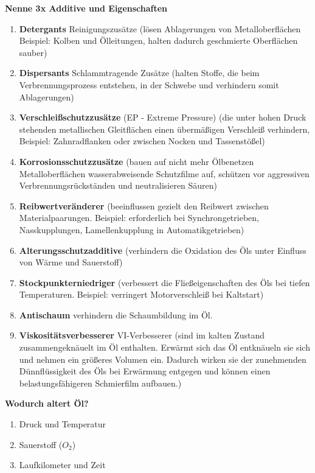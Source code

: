 \textbf{Nenne 3x Additive und Eigenschaften}

\begin{enumerate}
\item
  \textbf{Detergants} Reinigungszusätze (lösen Ablagerungen von
  Metalloberflächen Beispiel: Kolben und Ölleitungen, halten dadurch
  geschmierte Oberflächen sauber)
\item
  \textbf{Dispersants} Schlammtragende Zusätze (halten Stoffe, die beim
  Verbrennungsprozess entstehen, in der Schwebe und verhindern somit
  Ablagerungen)
\item
  \textbf{Verschleißschutzzusätze} (EP - Extreme Pressure) (die unter
  hohen Druck stehenden metallischen Gleitflächen einen übermäßigen
  Verschleiß verhindern, Beispiel: Zahnradflanken oder zwischen Nocken
  und Tassenstößel)
\item
  \textbf{Korrosionsschutzzusätze} (bauen auf nicht mehr Ölbenetzen
  Metalloberflächen wasserabweisende Schutzfilme auf, schützen vor
  aggressiven Verbrennungsrückständen und neutralisieren Säuren)
\item
  \textbf{Reibwertveränderer} (beeinflussen gezielt den Reibwert
  zwischen Materialpaarungen. Beispiel: erforderlich bei
  Synchrongetrieben, Nasskupplungen, Lamellenkupplung in
  Automatikgetrieben)
\item
  \textbf{Alterungsschutzadditive} (verhindern die Oxidation des Öls
  unter Einfluss von Wärme und Sauerstoff)
\item
  \textbf{Stockpunkterniedriger} (verbessert die Fließeigenschaften des
  Öls bei tiefen Temperaturen. Beispiel: verringert Motorverschleiß bei
  Kaltstart)
\item
  \textbf{Antischaum} verhindern die Schaumbildung im Öl.
\item
  \textbf{Viskositätsverbesserer} VI-Verbesserer (sind im kalten Zustand
  zusammengeknäuelt im Öl enthalten. Erwärmt sich das Öl entknäueln sie
  sich und nehmen ein größeres Volumen ein. Dadurch wirken sie der
  zunehmenden Dünnflüssigkeit des Öls bei Erwärmung entgegen und können
  einen belastungsfähigeren Schmierfilm aufbauen.)
\end{enumerate}

\textbf{Wodurch altert Öl?}

\begin{enumerate}
\item
  Druck und Temperatur
\item
  Sauerstoff ($O_2$)
\item
  Laufkilometer und Zeit
\end{enumerate}

